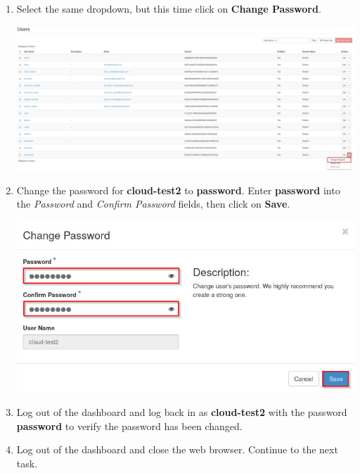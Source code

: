 \documentclass[letterpaper, 12pt]{article}
\begin{document}
\begin{enumerate}
    \item Select the same dropdown, but this time click on \textbf{Change Password}.

    \begin{center}
        \includegraphics[width=\linewidth]{images/part3/step11.png}
    \end{center}
    
    \item Change the password for \textbf{cloud-test2} to \textbf{password}. Enter \textbf{password} into the
    \textit{Password} and \textit{Confirm Password} fields, then click on \textbf{Save}.

    \begin{center}
        \includegraphics[width=\linewidth]{images/part3/step12.png}
    \end{center}

    \item Log out of the dashboard and log back in as \textbf{cloud-test2} with the password \textbf{password} to verify
    the password has been changed.

    \item Log out of the dashboard and close the web browser. Continue to the next task.
\end{enumerate}

\end{document}

